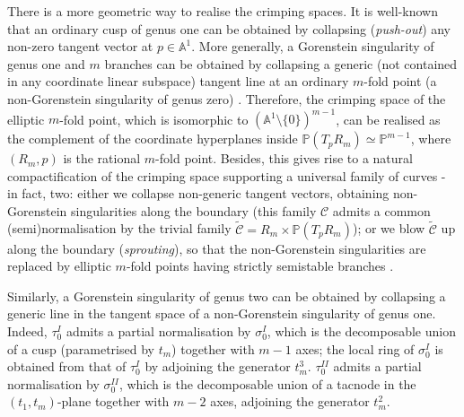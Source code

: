 \documentclass{compositio}
\newcommand{\PP}{\mathbb P}
\newcommand{\Aaff}{\mathbb A}
\theoremstyle{plain}
\theoremstyle{definition}
\theoremstyle{remark}
\begin{document}
There is a more geometric way to realise the crimping spaces. It is well-known that an ordinary cusp of genus one can be obtained by collapsing (\emph{push-out}) any non-zero tangent vector at $p\in\Aaff^1$. More generally, a Gorenstein singularity of genus one and $m$ branches can be obtained by collapsing a generic (not contained in any coordinate linear subspace) tangent line at an ordinary $m$-fold point (a non-Gorenstein singularity of genus zero) \cite[Lemma 2.2]{SMY1}. Therefore, the crimping space of the elliptic $m$-fold point, which is isomorphic to $(\Aaff^1\setminus\{0\})^{m-1}$, can be realised as the complement of the coordinate hyperplanes inside $\PP(T_pR_m)\simeq\PP^{m-1}$, where $(R_m,p)$ is the rational $m$-fold point. Besides, this gives rise to a natural compactification of the crimping space supporting a universal family of curves - in fact, two: either we collapse non-generic tangent vectors, obtaining non-Gorenstein singularities along the boundary (this family $\mathcal C$ admits a common (semi)normalisation by the trivial family $\widetilde{\mathcal C}=R_m\times \PP(T_pR_m)$); or we blow $\widetilde{\mathcal C}$ up along the boundary (\emph{sprouting}), so that the non-Gorenstein singularities are replaced by elliptic $m$-fold points having strictly semistable branches \cite[\S 2.2-3]{SMY2}.

Similarly, a Gorenstein singularity of genus two can be obtained by collapsing a generic line in the tangent space of a non-Gorenstein singularity of genus one. Indeed, $\tau_0^{I}$ admits a partial normalisation by $\sigma_0^{I}$, which is the decomposable union of a cusp (parametrised by $t_m$) together with $m-1$ axes; the local ring of $\sigma_0^{I}$ is obtained from that of $\tau_0^{I}$ by adjoining the generator $t_m^3$.  $\tau_0^{I\!I}$ admits a partial normalisation by $\sigma_0^{I\!I}$, which is the decomposable union of a tacnode in the $(t_1,t_m)$-plane together with $m-2$ axes, adjoining the generator $t_m^2$.
\end{document}
